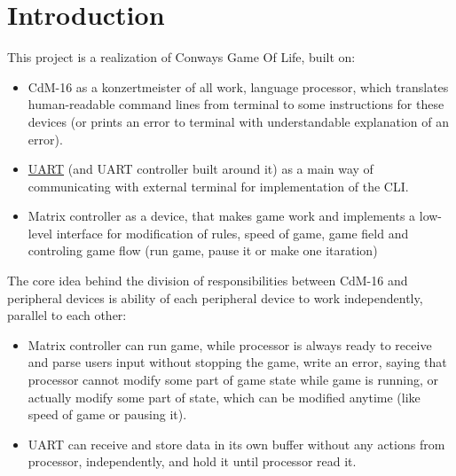 \chapter*{Introduction}

This project is a realization of Conways Game Of Life, built on:

\begin{itemize}
	\item CdM-16 as a konzertmeister of all work, language processor, which translates human-readable command lines from terminal to some instructions for these devices (or prints an error to terminal with understandable explanation of an error).
	\item \href{https://github.com/cdm-processors/logisim-uart}{UART} (and UART controller built around it) as a main way of communicating with external terminal for implementation of the CLI.
	\item Matrix controller as a device, that makes game work and implements a low-level interface for modification of rules, speed of game, game field and controling game flow (run game, pause it or make one itaration)
\end{itemize}

The core idea behind the division of responsibilities between CdM-16 and peripheral devices is ability of each peripheral device to work independently, parallel to each other:

\begin{itemize}
	\item Matrix controller can run game, while processor is always ready to receive and parse users input without stopping the game, write an error, saying that processor cannot modify some part of game state while game is running, or actually modify some part of state, which can be modified anytime (like speed of game or pausing it).
	\item UART can receive and store data in its own buffer without any actions from processor, independently, and hold it until processor read it.
\end{itemize}
